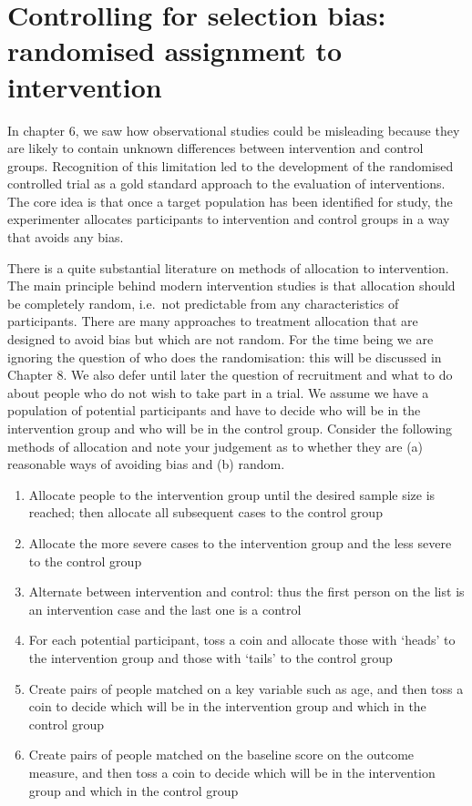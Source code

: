 \documentclass[]{book}
\providecommand{\tightlist}{%
  \setlength{\itemsep}{0pt}\setlength{\parskip}{0pt}}
\begin{document}
\hypertarget{controlling-for-selection-bias-randomised-assignment-to-intervention}{%
\chapter{Controlling for selection bias: randomised assignment to intervention}\label{controlling-for-selection-bias-randomised-assignment-to-intervention}}

In chapter 6, we saw how observational studies could be misleading because they are likely to contain unknown differences between intervention and control groups. Recognition of this limitation led to the development of the randomised controlled trial as a gold standard approach to the evaluation of interventions. The core idea is that once a target population has been identified for study, the experimenter allocates participants to intervention and control groups in a way that avoids any bias.

There is a quite substantial literature on methods of allocation to intervention. The main principle behind modern intervention studies is that allocation should be completely random, i.e.~not predictable from any characteristics of participants. There are many approaches to treatment allocation that are designed to avoid bias but which are not random. For the time being we are ignoring the question of who does the randomisation: this will be discussed in Chapter 8. We also defer until later the question of recruitment and what to do about people who do not wish to take part in a trial. We assume we have a population of potential participants and have to decide who will be in the intervention group and who will be in the control group. Consider the following methods of allocation and note your judgement as to whether they are (a) reasonable ways of avoiding bias and (b) random.

\begin{enumerate}
\def\labelenumi{\Alph{enumi}.}
\tightlist
\item
  Allocate people to the intervention group until the desired sample size is reached; then allocate all subsequent cases to the control group
\item
  Allocate the more severe cases to the intervention group and the less severe to the control group
\item
  Alternate between intervention and control: thus the first person on the list is an intervention case and the last one is a control
\item
  For each potential participant, toss a coin and allocate those with `heads' to the intervention group and those with `tails' to the control group
\item
  Create pairs of people matched on a key variable such as age, and then toss a coin to decide which will be in the intervention group and which in the control group
\item
  Create pairs of people matched on the baseline score on the outcome measure, and then toss a coin to decide which will be in the intervention group and which in the control group
\end{enumerate}
\end{document}
